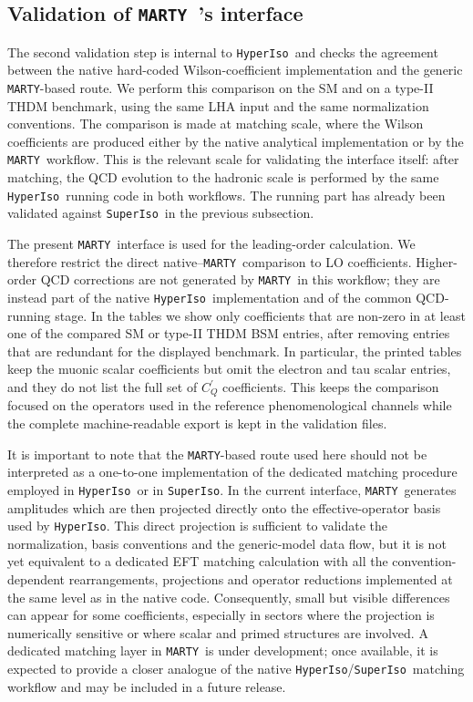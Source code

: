 \documentclass[preprint,11pt]{elsarticle}
\newcommand{\hi}{\texttt{HyperIso}}
\newcommand{\spi}{\texttt{SuperIso}}
\newcommand{\mty}{\texttt{MARTY}}
\begin{document}
\subsection{Validation of \mty~'s interface}

The second validation step is internal to \hi~and checks the agreement between the native hard-coded Wilson-coefficient implementation and the generic \mty-based route.  We perform this comparison on the SM and on a type-II THDM benchmark, using the same LHA input and the same normalization conventions.  The comparison is made at matching scale, where the Wilson coefficients are produced either by the native analytical implementation or by the \mty~workflow.  This is the relevant scale for validating the interface itself: after matching, the QCD evolution to the hadronic scale is performed by the same \hi~running code in both workflows.  The running part has already been validated against \spi~in the previous subsection.

The present \mty~interface is used for the leading-order calculation.  We therefore restrict the direct native--\mty~comparison to LO coefficients.  Higher-order QCD corrections are not generated by \mty~in this workflow; they are instead part of the native \hi~implementation and of the common QCD-running stage.  In the tables we show only coefficients that are non-zero in at least one of the compared SM or type-II THDM BSM entries, after removing entries that are redundant for the displayed benchmark.  In particular, the printed tables keep the muonic scalar coefficients but omit the electron and tau scalar entries, and they do not list the full set of \(C^\prime_Q\) coefficients.  This keeps the comparison focused on the operators used in the reference phenomenological channels while the complete machine-readable export is kept in the validation files.

It is important to note that the \mty-based route used here should not be interpreted as a one-to-one implementation of the dedicated matching procedure employed in \hi~or in \spi.  In the current interface, \mty~generates amplitudes which are then projected directly onto the effective-operator basis used by \hi.  This direct projection is sufficient to validate the normalization, basis conventions and the generic-model data flow, but it is not yet equivalent to a dedicated EFT matching calculation with all the convention-dependent rearrangements, projections and operator reductions implemented at the same level as in the native code.  Consequently, small but visible differences can appear for some coefficients, especially in sectors where the projection is numerically sensitive or where scalar and primed structures are involved.  A dedicated matching layer in \mty~is under development; once available, it is expected to provide a closer analogue of the native \hi/\spi~matching workflow and may be included in a future release.
\end{document}
